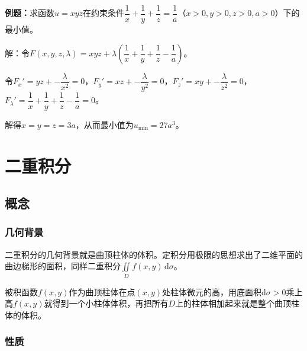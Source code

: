\documentclass[UTF8, 12pt]{ctexart}
\begin{document}
        \textbf{例题：}求函数$u=xyz$在约束条件$\dfrac{1}{x}+\dfrac{1}{y}+\dfrac{1}{z}=\dfrac{1}{a}$（$x>0,y>0,z>0,a>0$）下的最小值。

        解：令$F(x,y,z,\lambda)=xyz+\lambda\left(\dfrac{1}{x}+\dfrac{1}{y}+\dfrac{1}{z}-\dfrac{1}{a}\right)$。

        令$F_x'=yz+-\dfrac{\lambda}{x^2}=0$，$F_y'=xz+-\dfrac{\lambda}{y^2}=0$，$F_z'=xy+-\dfrac{\lambda}{z^2}=0$，$F_\lambda'=\dfrac{1}{x}+\dfrac{1}{y}+\dfrac{1}{z}-\dfrac{1}{a}=0$。

        解得$x=y=z=3a$，从而最小值为$u_{\min}=27a^3$。

        \section{二重积分}

        \subsection{概念}

        \subsubsection{几何背景}

        二重积分的几何背景就是曲顶柱体的体积。定积分用极限的思想求出了二维平面的曲边梯形的面积，同样二重积分$\iint\limits_Df(x,y)\,\textrm{d}\sigma$。

        被积函数$f(x,y)$作为曲顶柱体在点$(x,y)$处柱体微元的高，用底面积$\textrm{d}\sigma>0$乘上高$f(x,y)$就得到一个小柱体体积，再把所有$D$上的柱体相加起来就是整个曲顶柱体的体积。

        \subsubsection{性质}
\end{document}
